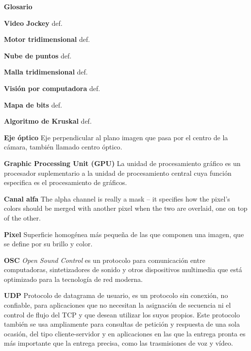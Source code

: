 ﻿\Huge
\textbf{Glosario}

\vspace{10 mm}

\normalsize 

\textbf{Video Jockey}
def. %

\textbf{Motor tridimensional}
def.
 
\textbf{Nube de puntos}
def.

\textbf{Malla tridimensional}
def.

\textbf{Visión por computadora}
def.

\textbf{Mapa de bits}
def.

\textbf{Algoritmo de Kruskal}
def.

\textbf{Eje óptico} 
Eje perpendicular al plano imagen que pasa por el centro de la cámara, también llamado centro óptico\cite{OpticalDesign}.

\textbf{Graphic Processing Unit (GPU)}
La unidad de procesamiento gráfico es un procesador suplementario a la unidad de procesamiento central cuya función especifica es el procesamiento de gráficos\cite{GPUWork}.

\textbf{Canal alfa}
The alpha channel is really a mask -- it specifies how the pixel's colors should be merged with another pixel when the two are overlaid, one on top of the other. 

\textbf{Pixel}
Superficie homogénea más pequeña de las que componen una imagen, que se define por su brillo y color\cite{RAE}.

\textbf{OSC}
\emph{Open Sound Control} es un protocolo para comunicación entre computadoras, sintetizadores de sonido y otros dispositivos multimedia que está optimizado para la tecnología de red moderna\cite{OSCProtocol}.

\textbf{UDP}
Protocolo de datagrama de usuario, es un protocolo sin conexión, no confiable, para aplicaciones que no necesitan la asignación de secuencia ni el control de flujo del TCP y que desean utilizar los suyos propios. Este protocolo también se usa ampliamente para consultas de petición y respuesta de una sola ocasión, del tipo cliente-servidor y en aplicaciones en las que la entrega pronta es más importante que la entrega precisa, como las trasmisiones de voz y vídeo\cite{Tanenbaum}.